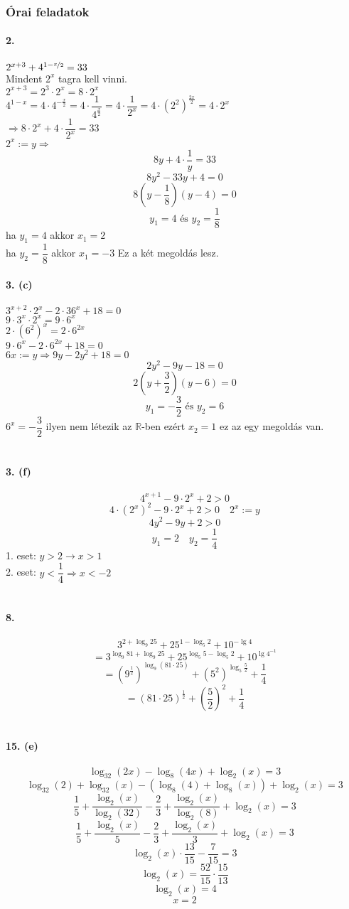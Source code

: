 \documentclass[12pt,a4paper,fleqn]{article}
\newcommand{\myparagraph}[1]{\paragraph{#1}\mbox{}}
\begin{document}
\subsubsection{Órai feladatok}
\myparagraph{2.}
$2^{x+3} + 4^{1-\nicefrac{x}{2}} = 33$ \\
Mindent $2^x$ tagra kell vinni. \\
$2^{x+3} = 2^3 \cdot 2^x = 8 \cdot 2^x$ \\
$4^{1-x} = 4 \cdot 4^{-\frac{x}{2}} = 4 \cdot \dfrac{1}{4^{\frac{x}{2}}} = 4 \cdot \dfrac{1}{2^x} = 4 \cdot (2^2)^{\frac{2x}{2}} = 4 \cdot 2^x$ \\
$\Rightarrow 8 \cdot 2^x + 4 \cdot \dfrac{1}{2^x} = 33$ \\
$2^x := y \Rightarrow$ \\
$$8y + 4 \cdot \dfrac{1}{y} = 33$$
$$ 8y^2 - 33y + 4 = 0 $$
$$ 8(y-\dfrac{1}{8})(y-4) =0 $$
$$ y_1 = 4 \text{ és } y_2 = \dfrac{1}{8} $$
ha $y_1 = 4$ akkor $x_1 = 2$ \\
ha $y_2 = \dfrac{1}{8}$ akkor $x_1 = -3$
Ez a két megoldás lesz.
\myparagraph{3. (c)}
$ 3^{x+2} \cdot 2^x - 2 \cdot 36^x + 18 = 0$ \\
$ 9 \cdot 3^x \cdot 2^x = 9 \cdot 6^x $ \\
$ 2 \cdot (6^2)^x= 2 \cdot 6^{2x}$ \\
$ 9 \cdot 6^x - 2 \cdot 6^{2x} + 18 = 0 $ \\
$ 6x := y \Rightarrow 9y - 2y^2 + 18 = 0 $ \\
$$ 2y^2 - 9y - 18 = 0 $$
$$ 2(y+\dfrac{3}{2})(y-6) = 0 $$
$$ y_1=-\dfrac{3}{2} \text{ és } y_2 = 6$$
$ 6^x = -\dfrac{3}{2}$ ilyen nem létezik az $\mathbb{R}$-ben ezért $ x_2 = 1 $ ez az egy megoldás van. \\\\
\myparagraph{3. (f)}
$$ 4^{x+1} - 9 \cdot 2^x + 2 > 0 $$
$$ 4 \cdot (2^x)^2 - 9 \cdot 2^x + 2 > 0 \quad 2^x:=y$$
$$ 4y^2 - 9y + 2 > 0 $$
$$ y_1 = 2 \quad y_2 = \dfrac{1}{4} $$
1. eset: $y > 2 \rightarrow x > 1$ \\
2. eset: $y < \dfrac{1}{4} \Rightarrow x < -2 $ \\\\
\myparagraph{8.}
$$ 3^{2+\log_9 25} + 25^{1-\log_5 2} + 10^{-\lg 4} $$
$$ = 3^{\log_9 81 + \log_9 25} + 25^{\log_5 5 - \log_5 2} + 10^{\lg 4^{-1}} $$
$$ = \left(9^{\frac{1}{2}}\right)^{\log_9 (81 \cdot 25)} + \left(5^2\right)^{\log_5 \frac{5}{2}} + \dfrac{1}{4} $$
$$ = (81 \cdot 25)^{\frac{1}{2}} + \left(\dfrac{5}{2}\right)^2 + \dfrac{1}{4} $$ \\
\myparagraph{15. (e)}
$$ \log_{32} (2x) - \log_8 (4x) + \log_2 (x) = 3 $$
$$ \log_{32} (2) + \log_{32} (x) - (\log_8 (4) + \log_8 (x)) + \log_2 (x) = 3 $$
$$ \dfrac{1}{5} + \dfrac{\log_2 (x)}{\log_2 (32)} - \dfrac{2}{3} + \dfrac{\log_2 (x)}{\log_2 (8)} + \log_2 (x) = 3$$
$$ \dfrac{1}{5} + \dfrac{\log_2 (x)}{5} - \dfrac{2}{3} + \dfrac{\log_2 (x)}{3} + \log_2 (x) = 3 $$
$$ \log_2 (x) \cdot \dfrac{13}{15} - \dfrac{7}{15} = 3 $$
$$ \log_2 (x) = \dfrac{52}{15} \cdot \dfrac{15}{13} $$
$$ \log_2 (x) = 4 $$
$$ x = 2 $$
\end{document}
